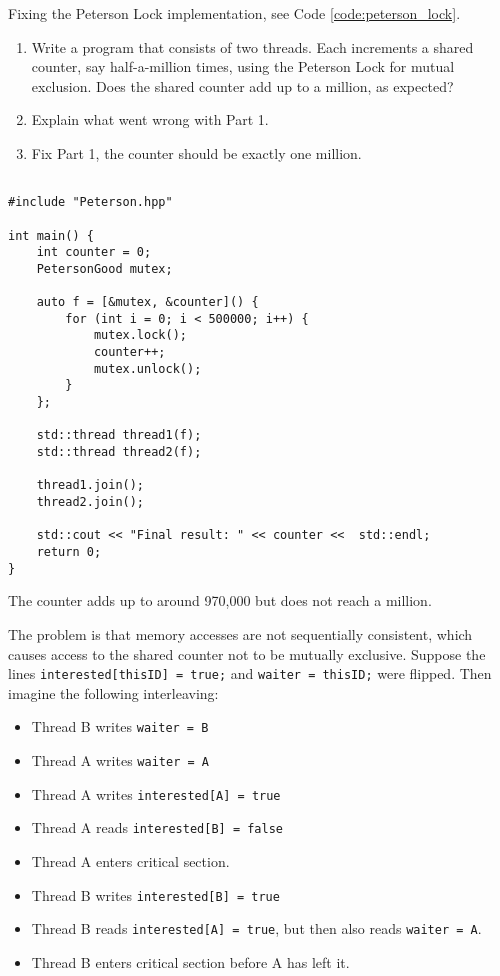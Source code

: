 \begin{exercise} \label{ex:fix_peterson}
    Fixing the Peterson Lock implementation, see Code \ref{code:peterson_lock}.
    \begin{enumerate}
        \item Write a program that consists of two threads. Each increments a shared counter, say half-a-million times, using the Peterson Lock for mutual exclusion. Does the shared counter add up to a million, as expected?
        \item Explain what went wrong with Part 1.
        \item Fix Part 1, the counter should be exactly one million.
    \end{enumerate}
\end{exercise}
\begin{solution}
\begin{verbatim}

#include "Peterson.hpp"

int main() {
    int counter = 0;
    PetersonGood mutex;

    auto f = [&mutex, &counter]() {
        for (int i = 0; i < 500000; i++) {
            mutex.lock();
            counter++;
            mutex.unlock();
        }
    };

    std::thread thread1(f);
    std::thread thread2(f);

    thread1.join();
    thread2.join();

    std::cout << "Final result: " << counter <<  std::endl;
    return 0;
}
\end{verbatim}

The counter adds up to around 970,000 but does not reach a million.

The problem is that memory accesses are not sequentially consistent, which causes access to the shared counter not to be mutually exclusive. Suppose the lines \verb|interested[thisID] = true;| and \verb|waiter = thisID;| were flipped. Then imagine the following interleaving:
\begin{itemize}
    \item Thread B writes \verb|waiter = B|
    \item Thread A writes \verb|waiter = A|
    \item Thread A writes \verb|interested[A] = true|
    \item Thread A reads \verb|interested[B] = false|
    \item Thread A enters critical section.
    \item Thread B writes \verb|interested[B] = true|
    \item Thread B reads \verb|interested[A] = true|, but then also reads \verb|waiter = A|.
    \item Thread B enters critical section before A has left it.
\end{itemize}


\end{solution}

